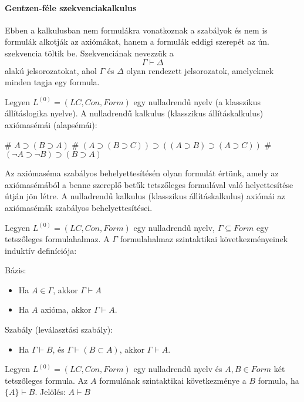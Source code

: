 \paragraph{Gentzen-féle szekvenciakalkulus}
Ebben a kalkulusban nem formulákra vonatkoznak a szabályok és nem is formulák alkotják az axiómákat, hanem a formulák eddigi szerepét az ún. szekvencia töltik be. Szekvenciának nevezzük a
$$\Gamma \vdash \Delta$$
alakú jelsorozatokat, ahol $\Gamma$ és $\Delta$ olyan rendezett jelsorozatok, amelyeknek minden tagja egy formula.
\begin{definition}[axiómasémák]
	Legyen $L^{(0)} = (LC, Con, Form)$ egy nulladrendű nyelv (a klasszikus állításlogika nyelve). A nulladrendű kalkulus (klasszikus állításkalkulus) axiómasémái (alapsémái):
	\begin{easylist}
		# $A \supset (B \supset A)$
		# $(A \supset (B \supset C)) \supset ((A \supset B) \supset (A \supset C))$
		# $(\neg A \supset \neg B) \supset (B \supset A)$
	\end{easylist}
\end{definition}

Az axiómaséma szabályos behelyettesítésén olyan formulát értünk, amely az axiómasémából a benne szereplő betűk tetszőleges formulával való helyettesítése útján jön létre. A nulladrendű kalkulus (klasszikus állításkalkulus) axiómái az axiómasémák szabályos behelyettesítései. 

\begin{definition}
	Legyen $L^{(0)} = (LC, Con, Form)$ egy nulladrendű nyelv, $\Gamma \subseteq Form$ egy tetszőleges formulahalmaz. A $\Gamma$ formulahalmaz szintaktikai következményeinek induktív definíciója:

	Bázis:
	\begin{itemize}
		\item Ha $A \in \Gamma$, akkor $\Gamma \vdash A$ 
		\item Ha $A$ axióma, akkor $\Gamma \vdash A$. 
	\end{itemize}
	
	Szabály (leválasztási szabály): 
	\begin{itemize}
		\item Ha $\Gamma \vdash B$, és $\Gamma \vdash (B \subset A)$, akkor $\Gamma \vdash A$. 
	\end{itemize}
\end{definition}

\begin{definition}
Legyen $L^{(0)} = (LC, Con, Form)$ egy nulladrendű nyelv és $A, B \in Form$ két tetszőleges formula. Az $A$ formulának szintaktikai következménye a $B$ formula, ha $\{A\} \vdash B$. Jelölés: $A \vdash B$ 
\end{definition}

